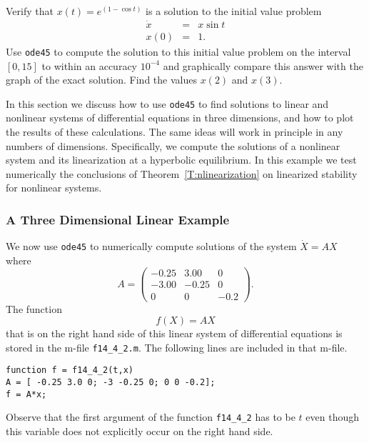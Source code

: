 \begin{exercise}  \label{c11.3.2B}
Verify that $x(t) = e^{(1-\cos t)}$ is a solution to the initial value problem
\[
\begin{array}{rcl}
\dot{x} & = & x\sin t \\
x(0) & = & 1.
\end{array}
\]
Use {\tt ode45} to compute the solution to this initial value problem on the
interval $[0,15]$ to within an accuracy $10^{-4}$ and graphically compare 
this answer with the graph of the exact solution.  Find the values $x(2)$ 
and $x(3)$. 
\end{exercise}



\label{S:ode45HD}

In this section we discuss how to use {\tt ode45} to find solutions to linear
and nonlinear systems of differential equations in three dimensions, and how 
to plot the results of these calculations.  The same ideas will work in 
principle in any numbers of dimensions.  Specifically, we compute the solutions 
of a nonlinear system and its linearization at a hyperbolic equilibrium.  In 
this example we test numerically the conclusions of 
Theorem~\ref{T:nlinearization} on linearized stability for nonlinear systems.

 
\subsubsection*{A Three Dimensional Linear Example}

We now use {\tt ode45} to numerically compute solutions of the system
$\dot{X} = AX$ where 
\begin{equation}  \label{E:3dexample}
A = \left(\begin{array}{rrr}
  -0.25 & 3.00 & 0\\
   -3.00 & -0.25 &  0\\
   0 &  0 & -0.2
\end{array}\right).
\end{equation}
The function  
\begin{equation*}
f(X) = AX
\end{equation*}
that is on the right hand side of this linear system of differential 
equations is stored in the m-file {\tt f14\_4\_2.m}.  The following lines 
are included in that m-file.
\begin{verbatim}
function f = f14_4_2(t,x)
A = [ -0.25 3.0 0; -3 -0.25 0; 0 0 -0.2];
f = A*x;
\end{verbatim}
Observe that the first argument of the function {\tt f14\_4\_2} has to be 
$t$ even though this variable does not explicitly occur on the right hand 
side.  

